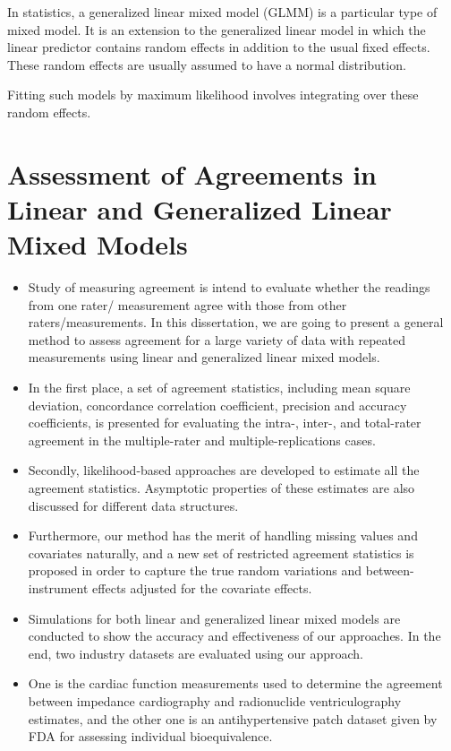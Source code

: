 \documentclass[12pt, a4paper]{report}
\theoremstyle{plain}
\theoremstyle{definition}
\theoremstyle{remark}
\begin{document}
	In statistics, a generalized linear mixed model (GLMM) is a particular type of mixed model. It is an extension to the
	generalized linear model in which the linear predictor contains random effects in addition to the usual fixed effects. These random effects are usually assumed to have a normal distribution.
	
	Fitting such models by maximum likelihood involves integrating over these random effects.
	
	
	

	
	
	\section{Assessment of Agreements in Linear and Generalized Linear Mixed Models}
	
	\begin{itemize}
		\item Study of measuring agreement is intend to evaluate whether the readings from one rater/ measurement 
		agree with those from other raters/measurements. 
		In this dissertation, we are going to present a general method to assess agreement for a large 
		variety of data with repeated measurements using linear and generalized linear mixed models. 
		\item In the first place, a set of agreement statistics, including mean square deviation, concordance 
		correlation coefficient, precision and accuracy coefficients, is presented for evaluating the 
		intra-, inter-, and total-rater agreement in the multiple-rater and multiple-replications cases. 
		\item Secondly, likelihood-based approaches are developed to estimate all the agreement statistics. 
		Asymptotic properties of these estimates are also discussed for different data structures. 
		\item Furthermore, our method has the merit of handling missing values and covariates naturally, 
		and a new set of restricted agreement statistics is proposed in order to capture the true random 
		variations and between-instrument effects adjusted for the covariate effects. 
		
		\item Simulations for both linear and generalized linear mixed models are conducted to show the accuracy and effectiveness 
		of our approaches. In the end, two industry datasets are evaluated using our approach. 
		\item One is the cardiac function measurements used to determine the agreement between impedance cardiography and radionuclide 
		ventriculography estimates, and the other one is an antihypertensive patch dataset given by FDA for assessing 
		individual bioequivalence.
	\end{itemize}
\end{document}
